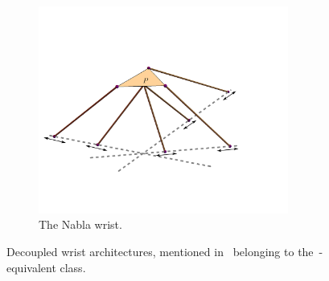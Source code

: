 \documentclass[DD]{iitmdiss}
\newcommand{\mcite}[1]{\cite{#1}}
\begin{document}
\begin{figure}[h]
	\begin{subfigure}{0.6\textwidth}
		\centering
		\includegraphics[width=0.9\textwidth]{nabla.png}
		\caption{The Nabla wrist.}
		\label{fg:nabla}
	\end{subfigure}
	\caption{Decoupled wrist architectures, mentioned in~\mcite{merletbook} belonging to the~\rps-equivalent class.}
\end{figure}
%
\end{document}

